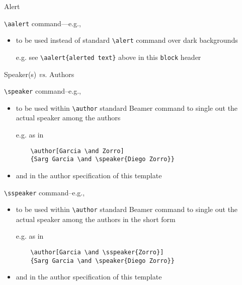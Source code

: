 \documentclass[presentation]{beamer}\mode<presentation>{\usetheme{AMSBolognaFC}}
\begin{document}
\begin{frame}[c,fragile]{Alert}
%
\begin{block}{\texttt{\textbackslash{}aalert} command---e.g., }
\begin{itemize}
	\item to be used instead of standard \texttt{\textbackslash{}alert} command over dark backgrounds
	\item[e.g.] see \verb|\aalert{alerted text}| above in this \texttt{block} header
\end{itemize}
\end{block}
%
\end{frame}

\begin{frame}{Speaker(s) \emph{vs.} Authors}
%
\begin{exampleblock}{\texttt{\textbackslash{}speaker} command--e.g., }
\begin{itemize}
	\item to be used within \texttt{\textbackslash{}author} standard Beamer command to single out the actual speaker among the authors
	\item[e.g.] as in
\begin{verbatim}
	\author[Garcia \and Zorro]
	{Sarg Garcia \and \speaker{Diego Zorro}}
\end{verbatim}
	\item and in the author specification of this template
\end{itemize}
\end{exampleblock}
%
\begin{block}{\texttt{\textbackslash{}sspeaker} command--e.g., }
\begin{itemize}
	\item to be used within \texttt{\textbackslash{}author} standard Beamer command to single out the actual speaker among the authors in the short form
	\item[e.g.] as in
\begin{verbatim}
	\author[Garcia \and \sspeaker{Zorro}]
	{Sarg Garcia \and \speaker{Diego Zorro}}
\end{verbatim}
	\item and in the author specification of this template
\end{itemize}
\end{block}

\end{frame}
\end{document}

